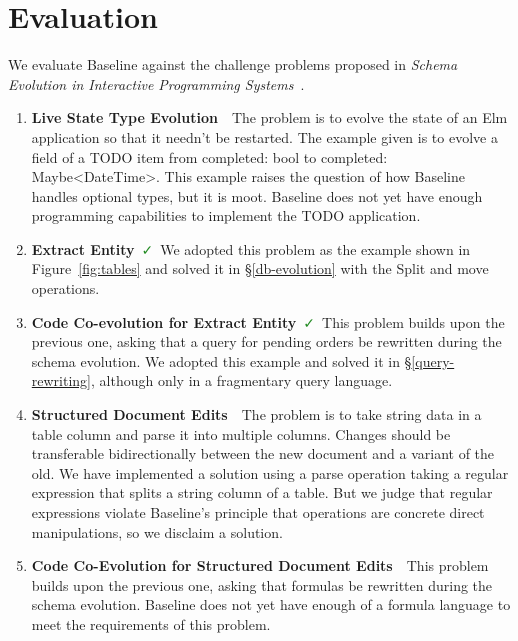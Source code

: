 \documentclass[english,submission]{programming}
\theoremstyle{definition}
\newcommand{\redCross}{\textcolor{red}{\ \faTimes\ }}
\newcommand{\greenCheck}{\textcolor{ForestGreen}{\ \faCheck\ }}
\begin{document}
\section{Evaluation}

We evaluate Baseline against the challenge problems proposed in
\textit{Schema Evolution in Interactive Programming Systems}~\cite{challenge-problems}.

\begin{enumerate}

  \item \textbf{Live State Type Evolution}\redCross The problem is to evolve the state of an Elm application so that it needn't be restarted.
  The example given is to evolve a field of a TODO item from \textsf{completed: bool} to \textsf{completed: Maybe<DateTime>}. This example raises the question of how Baseline handles optional types, but it is moot. Baseline does not yet have enough programming capabilities to implement the TODO application.

  \item \textbf{Extract Entity}\greenCheck We adopted this problem as the example  shown in Figure~\ref{fig:tables} and solved it in \S\ref{db-evolution} with the \textsf{Split} and \textsf{move} operations.

  \item \textbf{Code Co-evolution for Extract Entity}\greenCheck This problem builds upon the previous one, asking that a query for pending orders be rewritten during the schema evolution. We adopted this example and solved it in \S\ref{query-rewriting}, although only in a fragmentary query language.

  \item \textbf{Structured Document Edits}\redCross The problem is to take string data in a table column and parse it into multiple columns. Changes should be transferable bidirectionally between the new document and a variant of the old. We have implemented a solution using a \textsf{parse} operation taking a regular expression that splits a string column of a table. But we judge that regular expressions violate Baseline's principle that operations are concrete direct manipulations, so we disclaim a solution.

  \item \textbf{Code Co-Evolution for Structured Document Edits}\redCross This problem builds upon the previous one, asking that formulas be rewritten during the schema evolution. Baseline does not yet have enough of a formula language to meet the requirements of this problem.


\end{enumerate}
\end{document}

